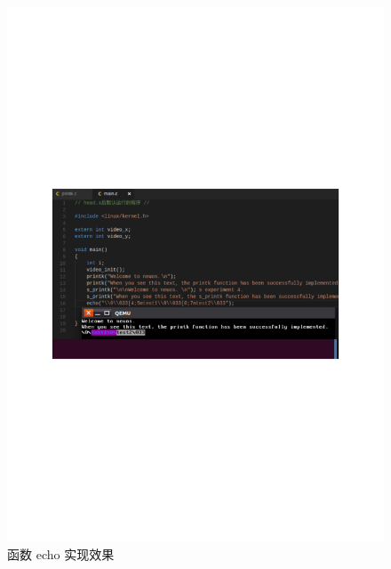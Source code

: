 \begin{figure}[htbp]
    \centering
    \includegraphics[width=\textwidth]{img/函数echo实现效果.pdf}
    \caption{函数 echo 实现效果}
    \label{fig:函数echo实现效果}
\end{figure}
